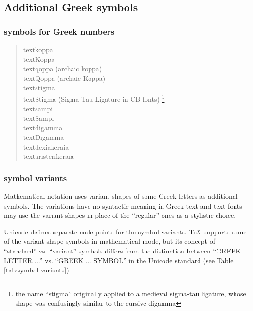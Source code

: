 \documentclass[a4paper]{article}
\begin{document}
\subsection{Additional Greek symbols}

\subsubsection{symbols for Greek numbers}

\begin{quote}
\textkoppa{}      textkoppa                 \\ %
\textKoppa{}      textKoppa                 \\ %
\textqoppa{}      textqoppa (archaic koppa) \\ %
\textQoppa{}      textQoppa (archaic Koppa) \\ %
\textstigma{}     textstigma                \\ %
\textStigma{}     textStigma (Sigma-Tau-Ligature in CB-fonts)%
\footnote{the name “stigma” originally applied to a medieval sigma-tau
         ligature, whose shape was confusingly similar to the cursive
         digamma}                      \\ %
\textsampi{}      textsampi  \\ %
\textSampi{}      textSampi  \\ %
\textdigamma{}    textdigamma  \\ %
\textDigamma{}    textDigamma  \\ %
\textdexiakeraia{}    textdexiakeraia  \\ %
\textaristerikeraia{} textaristerikeraia \\ %
\end{quote}

\subsubsection{symbol variants}

Mathematical notation uses variant shapes of some Greek letters as
additional symbols. The variations have no syntactic meaning in Greek text
and text fonts may use the variant shapes in place of the “regular” ones as
a stylistic choice.

Unicode defines separate code points for the symbol variants. TeX supports
some of the variant shape symbols in mathematical mode, but its concept of
“standard” vs. “variant” symbols differs from the distinction between
“GREEK LETTER ...” vs. “GREEK ... SYMBOL” in the Unicode standard (see
Table \ref{tab:symbol-variants}).
\end{document}
